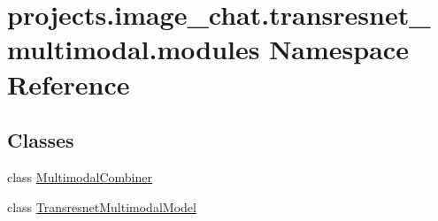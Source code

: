 \hypertarget{namespaceprojects_1_1image__chat_1_1transresnet__multimodal_1_1modules}{}\section{projects.\+image\+\_\+chat.\+transresnet\+\_\+multimodal.\+modules Namespace Reference}
\label{namespaceprojects_1_1image__chat_1_1transresnet__multimodal_1_1modules}
\subsection*{Classes}
\begin{DoxyCompactItemize}
\item 
class \hyperlink{classprojects_1_1image__chat_1_1transresnet__multimodal_1_1modules_1_1MultimodalCombiner}{Multimodal\+Combiner}
\item 
class \hyperlink{classprojects_1_1image__chat_1_1transresnet__multimodal_1_1modules_1_1TransresnetMultimodalModel}{Transresnet\+Multimodal\+Model}
\end{DoxyCompactItemize}
